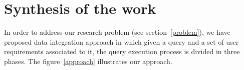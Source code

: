 


\section{Synthesis of the work}

In order to address our research problem (see section~\ref{problem}), we have proposed data integration approach in which given a query and a set of user requirements associated to it, the query execution process is divided in three phases. The figure~\ref{approach} illustrates our approach.


	

